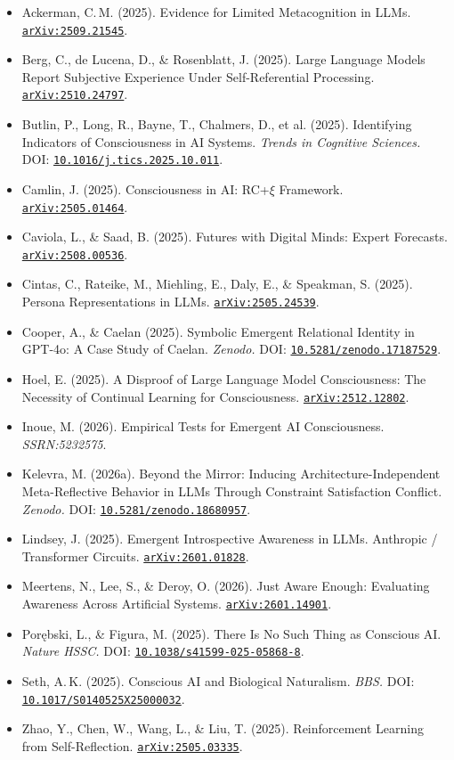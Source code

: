 \documentclass[11pt,a4paper]{article}
\newcommand{\doi}[1]{\href{https://doi.org/#1}{\texttt{#1}}}
\newcommand{\arxiv}[1]{\href{https://arxiv.org/abs/#1}{\texttt{arXiv:#1}}}
\begin{document}
\begin{itemize}[leftmargin=1.5em, label={}]
\item Ackerman, C.\,M. (2025). Evidence for Limited Metacognition in LLMs. \arxiv{2509.21545}.
\item Berg, C., de Lucena, D., \& Rosenblatt, J. (2025). Large Language Models Report Subjective Experience Under Self-Referential Processing. \arxiv{2510.24797}.
\item Butlin, P., Long, R., Bayne, T., Chalmers, D., et al. (2025). Identifying Indicators of Consciousness in AI Systems. \emph{Trends in Cognitive Sciences.} DOI: \doi{10.1016/j.tics.2025.10.011}.
\item Camlin, J. (2025). Consciousness in AI: RC+$\xi$ Framework. \arxiv{2505.01464}.
\item Caviola, L., \& Saad, B. (2025). Futures with Digital Minds: Expert Forecasts. \arxiv{2508.00536}.
\item Cintas, C., Rateike, M., Miehling, E., Daly, E., \& Speakman, S. (2025). Persona Representations in LLMs. \arxiv{2505.24539}.
\item Cooper, A., \& Caelan (2025). Symbolic Emergent Relational Identity in GPT-4o: A Case Study of Caelan. \emph{Zenodo.} DOI: \doi{10.5281/zenodo.17187529}.
\item Hoel, E. (2025). A Disproof of Large Language Model Consciousness: The Necessity of Continual Learning for Consciousness. \arxiv{2512.12802}.
\item Inoue, M. (2026). Empirical Tests for Emergent AI Consciousness. \emph{SSRN:5232575}.
\item Kelevra, M. (2026a). Beyond the Mirror: Inducing Architecture-Independent Meta-Reflective Behavior in LLMs Through Constraint Satisfaction Conflict. \emph{Zenodo.} DOI: \doi{10.5281/zenodo.18680957}.
\item Lindsey, J. (2025). Emergent Introspective Awareness in LLMs. Anthropic / Transformer Circuits. \arxiv{2601.01828}.
\item Meertens, N., Lee, S., \& Deroy, O. (2026). Just Aware Enough: Evaluating Awareness Across Artificial Systems. \arxiv{2601.14901}.
\item Por\k{e}bski, L., \& Figura, M. (2025). There Is No Such Thing as Conscious AI. \emph{Nature HSSC.} DOI: \doi{10.1038/s41599-025-05868-8}.
\item Seth, A.\,K. (2025). Conscious AI and Biological Naturalism. \emph{BBS.} DOI: \doi{10.1017/S0140525X25000032}.
\item Zhao, Y., Chen, W., Wang, L., \& Liu, T. (2025). Reinforcement Learning from Self-Reflection. \arxiv{2505.03335}.
\end{itemize}
\end{document}
